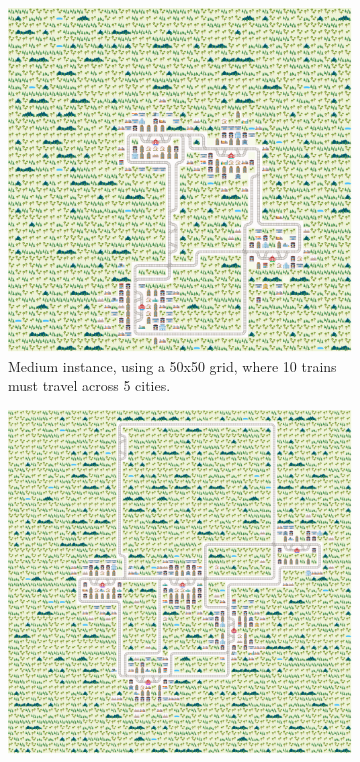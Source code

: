 \documentclass[runningheads]{llncs}
\begin{document}
\begin{figure}
\begin{minipage}{.41\textwidth}
		\begin{subfigure}{\textwidth}
			\centering
			\includegraphics[width=\textwidth]{medium/medium_0_1}
			\caption{Medium instance, using a 50x50 grid, where 10 trains must travel across 5 cities.}
			\label{medium_0_1}
		\end{subfigure}
	\end{minipage}
	\hfill
	\begin{minipage}{.49\textwidth}
				\begin{subfigure}{\textwidth}
		\centering
		\includegraphics[width=\textwidth]{sparse/sparse_0_1}

\end{subfigure}
\end{minipage}
\end{figure}
\end{document}
